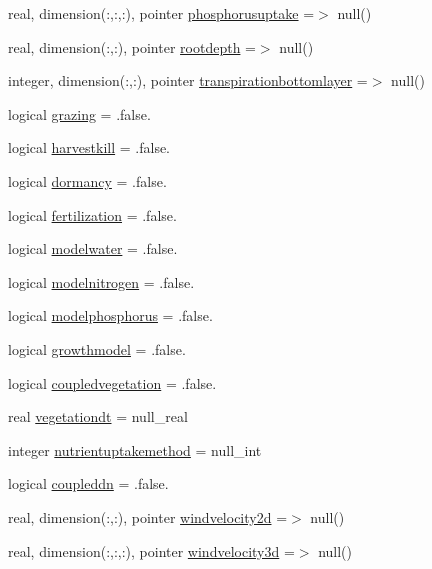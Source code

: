 \begin{DoxyCompactItemize}
real, dimension(\+:,\+:,\+:), pointer \mbox{\hyperlink{structmoduleporousmediaproperties_1_1t__extvar_abcd42be9e314b63a536dc43f1de08255}{phosphorusuptake}} =$>$ null()
\item 
real, dimension(\+:,\+:), pointer \mbox{\hyperlink{structmoduleporousmediaproperties_1_1t__extvar_a7cc57874b17ca9e6bb7640eab01f9afd}{rootdepth}} =$>$ null()
\item 
integer, dimension(\+:,\+:), pointer \mbox{\hyperlink{structmoduleporousmediaproperties_1_1t__extvar_a0e9b9927055135ed6f37d53a544e8956}{transpirationbottomlayer}} =$>$ null()
\item 
logical \mbox{\hyperlink{structmoduleporousmediaproperties_1_1t__extvar_a4a175eae924063b0804c332e20a30613}{grazing}} = .false.
\item 
logical \mbox{\hyperlink{structmoduleporousmediaproperties_1_1t__extvar_a5c643110af9528ba929715a33b542b36}{harvestkill}} = .false.
\item 
logical \mbox{\hyperlink{structmoduleporousmediaproperties_1_1t__extvar_a9f50a740e7145351a15bd99eb3d71f80}{dormancy}} = .false.
\item 
logical \mbox{\hyperlink{structmoduleporousmediaproperties_1_1t__extvar_afacd61b079598aed4b22b1c0eecded0f}{fertilization}} = .false.
\item 
logical \mbox{\hyperlink{structmoduleporousmediaproperties_1_1t__extvar_a4085b9b0d66028431b717168fc513ff9}{modelwater}} = .false.
\item 
logical \mbox{\hyperlink{structmoduleporousmediaproperties_1_1t__extvar_a203ac32240a31e960e07a68a5870c298}{modelnitrogen}} = .false.
\item 
logical \mbox{\hyperlink{structmoduleporousmediaproperties_1_1t__extvar_ae40ac6f9d48be5175e7858de45a36590}{modelphosphorus}} = .false.
\item 
logical \mbox{\hyperlink{structmoduleporousmediaproperties_1_1t__extvar_a6c068de60c6547f9ebed32cc16c55648}{growthmodel}} = .false.
\item 
logical \mbox{\hyperlink{structmoduleporousmediaproperties_1_1t__extvar_a9134733c56238e8c79fabcc941fd29ca}{coupledvegetation}} = .false.
\item 
real \mbox{\hyperlink{structmoduleporousmediaproperties_1_1t__extvar_ad8d00b86452a14ca13813e800f40491f}{vegetationdt}} = null\+\_\+real
\item 
integer \mbox{\hyperlink{structmoduleporousmediaproperties_1_1t__extvar_aac23dbf2645fc27e592e4e04c414f36d}{nutrientuptakemethod}} = null\+\_\+int
\item 
logical \mbox{\hyperlink{structmoduleporousmediaproperties_1_1t__extvar_a7f59bb197c2372bd4f10cfd687309f73}{coupleddn}} = .false.
\item 
real, dimension(\+:,\+:), pointer \mbox{\hyperlink{structmoduleporousmediaproperties_1_1t__extvar_ac3149ff55af19d8a36e05fb237b06f8f}{windvelocity2d}} =$>$ null()
\item 
real, dimension(\+:,\+:,\+:), pointer \mbox{\hyperlink{structmoduleporousmediaproperties_1_1t__extvar_a3be75db9b58faad647dcdfade10af1df}{windvelocity3d}} =$>$ null()
\end{DoxyCompactItemize}


